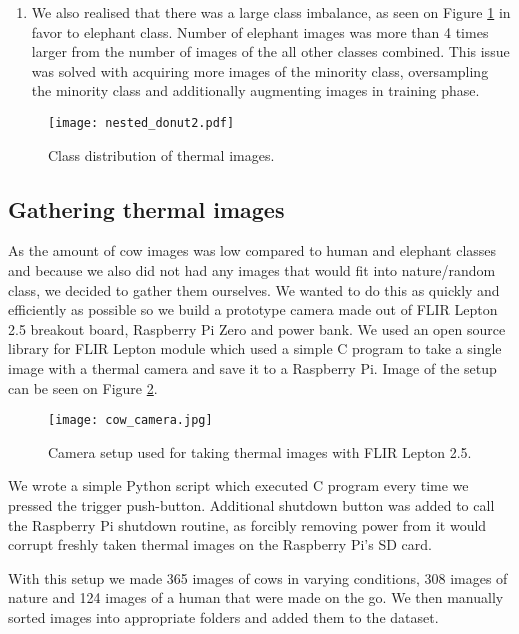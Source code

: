 \begin{enumerate}
    \item We also realised that there was a large class imbalance, as seen on Figure \ref{nested_donut2} in favor to elephant class.
Number of elephant images was more than 4 times larger from the number of images of the all other classes combined.
This issue was solved with acquiring more images of the minority class, oversampling the minority class and additionally augmenting images in training phase.
\end{enumerate}

\begin{figure}[ht]
    \centering
    \texttt{[image: nested\_donut2.pdf]} 
    \caption{Class distribution of thermal images.}
    \label{nested_donut2}
\end{figure}

\subsection{ Gathering thermal images}

As the amount of cow images was low compared to human and elephant classes and because we also did not had any images that would fit into nature/random class, we decided to gather them ourselves.
We wanted to do this as quickly and efficiently as possible so we build a prototype camera made out of FLIR Lepton 2.5 breakout board, Raspberry Pi Zero and power bank.
We used an open source library \cite{flir_github} for FLIR Lepton module which used a simple C program to take a single image with a thermal camera and save it to a Raspberry Pi.
Image of the setup can be seen on Figure \ref{cow_camera}.

\begin{figure}[ht]
    \centering
    \texttt{[image: cow\_camera.jpg]} 
    \caption{Camera setup used for taking thermal images with FLIR Lepton 2.5.}
    \label{cow_camera}
\end{figure}

We wrote a simple Python script which executed C program every time we pressed the trigger push-button.
Additional shutdown button was added to call the Raspberry Pi shutdown routine, as forcibly removing power from it would corrupt freshly taken thermal images on the Raspberry Pi's SD card.

With this setup we made 365 images of cows in varying conditions, 308 images of nature and 124 images of a human that were made on the go.
We then manually sorted images into appropriate folders and added them to the dataset.


